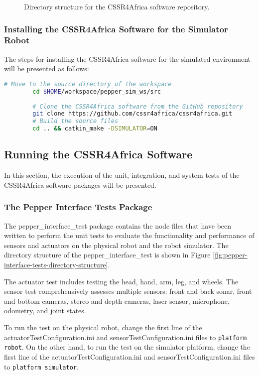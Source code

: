 \documentclass{CSSRforAfrica}
\begin{document}
{\begin{figure}[H]
			\caption{Directory structure for the CSSR4Africa software repository.}
			\label{fig:pepper-robot-workspace-directory}
		\end{figure}
		
		\subsubsection{Installing the CSSR4Africa Software for the Simulator Robot}
		\label{sim-soft}
		The steps for installing the CSSR4Africa software for the simulated environment will be presented as follows:
		
		\begin{lstlisting}[style=withoutNumbering, language=bash]
		# Move to the source directory of the workspace
		cd $HOME/workspace/pepper_sim_ws/src
		
		# Clone the CSSR4Africa software from the GitHub repository
		git clone https://github.com/cssr4africa/cssr4africa.git
		# Build the source files
		cd .. && catkin_make -DSIMULATOR=ON
		\end{lstlisting}
		
		\subsection{Running the CSSR4Africa Software}
		In this section, the execution of the unit, integration, and system tests of the CSSR4Africa software packages will be presented.
		
		\subsubsection{The Pepper Interface Tests Package}
		The pepper\_interface\_test package contains the node files that have been written to perform the unit tests to evaluate the functionality and performance of sensors and actuators on the physical robot and the robot simulator. The directory structure of the pepper\_interface\_test is shown in Figure \ref{fig:pepper-interface-tests-directory-structure}.
		
		The actuator test includes testing the head, hand, arm, leg, and wheels. The sensor test comprehensively assesses multiple sensors: front and back sonar, front and bottom cameras, stereo and depth cameras, laser sensor, microphone, odometry, and joint states.
		
		\noindent To run the test on the physical robot, change the first line of the actuatorTestConfiguration.ini and sensorTestConfiguration.ini files to \texttt{platform robot}. On the other hand, to run the test on the simulator platform, change the first line of the actuatorTestConfiguration.ini and sensorTestConfiguration.ini files to \texttt{platform simulator}. 
		
}
\end{document}
